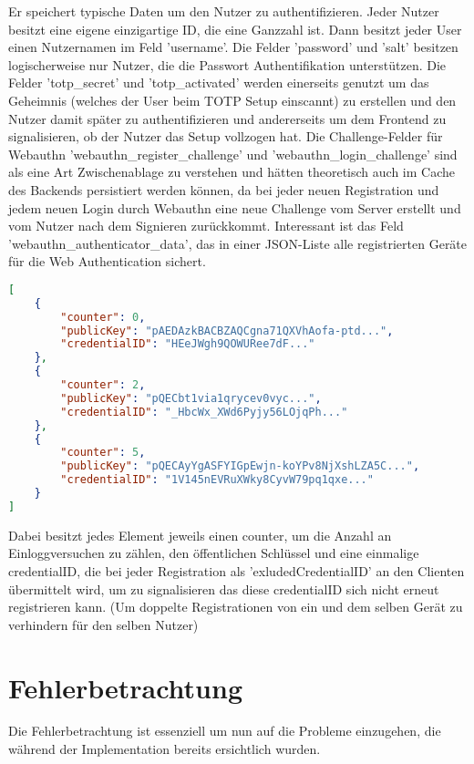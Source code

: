 \begin{enumerate}
Er speichert typische Daten um den Nutzer zu authentifizieren. Jeder Nutzer besitzt eine eigene einzigartige ID, die eine Ganzzahl ist. Dann besitzt jeder User einen Nutzernamen im Feld 'username'. Die Felder 'password' und 'salt' besitzen logischerweise nur Nutzer, die die Passwort Authentifikation unterstützen. Die Felder 'totp\_secret' und 'totp\_activated' werden einerseits genutzt um das Geheimnis (welches der User beim TOTP Setup einscannt) zu erstellen und den Nutzer damit später zu authentifizieren und andererseits um dem Frontend zu signalisieren, ob der Nutzer das Setup vollzogen hat. Die Challenge-Felder für Webauthn 'webauthn\_register\_challenge' und 'webauthn\_login\_challenge' sind als eine Art Zwischenablage zu verstehen und hätten theoretisch auch im Cache des Backends persistiert werden können, da bei jeder neuen Registration und jedem neuen Login durch Webauthn eine neue Challenge vom Server erstellt und vom Nutzer nach dem Signieren zurückkommt. Interessant ist das Feld 'webauthn\_authenticator\_data', das in einer JSON-Liste alle registrierten Geräte für die Web Authentication sichert.
\newpage

 \begin{lstlisting}[language=json,firstnumber=1]
[
    {
        "counter": 0,
        "publicKey": "pAEDAzkBACBZAQCgna71QXVhAofa-ptd...",
        "credentialID": "HEeJWgh9QOWURee7dF..."
    },
    {
        "counter": 2,
        "publicKey": "pQECbt1via1qrycev0vyc...",
        "credentialID": "_HbcWx_XWd6Pyjy56LOjqPh..."
    },
    {
        "counter": 5,
        "publicKey": "pQECAyYgASFYIGpEwjn-koYPv8NjXshLZA5C...",
        "credentialID": "1V145nEVRuXWky8CyvW79pq1qxe..."
    }
]
\end{lstlisting}

Dabei besitzt jedes Element jeweils einen counter, um die Anzahl an Einloggversuchen zu zählen, den öffentlichen Schlüssel und eine einmalige credentialID, die bei jeder Registration als 'exludedCredentialID' an den Clienten übermittelt wird, um zu signalisieren das diese credentialID sich nicht erneut registrieren kann. (Um doppelte Registrationen von ein und dem selben Gerät zu verhindern für den selben Nutzer)
\end{enumerate}

\section{Fehlerbetrachtung}

Die Fehlerbetrachtung ist essenziell um nun auf die Probleme einzugehen, die während der Implementation bereits ersichtlich wurden.

